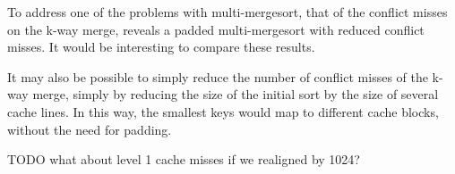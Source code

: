 To address one of the problems with multi-mergesort, that of the conflict misses
on the k-way merge, \cite{Xiao00} reveals a padded multi-mergesort with reduced 
conflict misses. It would be interesting to compare these results.

It may also be possible to simply reduce the number of conflict misses of the
k-way merge, simply by reducing the size of the initial sort by the size of
several cache lines. In this way, the smallest keys would map to different
cache blocks, without the need for padding.

TODO what about level 1 cache misses if we realigned by 1024?
